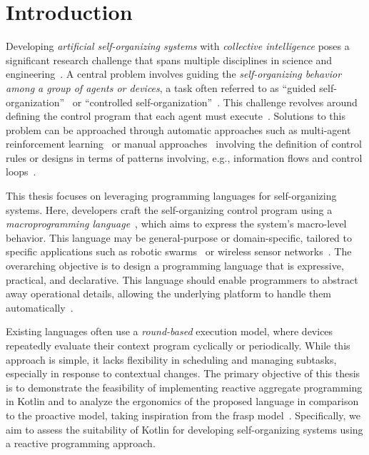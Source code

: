 
\chapter{Introduction}
\label{chap:introduction}

Developing \textit{artificial self-organizing systems} with \textit{collective intelligence} poses a significant research challenge that spans multiple disciplines in science and engineering~\cite{Parunak2015, Gershenson2007, Singh2013, DeNicola2020}. A central problem involves guiding the \textit{self-organizing behavior among a group of agents or devices}, a task often referred to as ``guided self-organization''~\cite{Prokopenko2007} or ``controlled self-organization''~\cite{Schmeck2010}. This challenge revolves around defining the control program that each agent must execute~\cite{Martius2011}. Solutions to this problem can be approached through automatic approaches such as multi-agent reinforcement learning~\cite{Zhang2021} or manual approaches~\cite{Martius2011} involving the definition of control rules or designs in terms of patterns
involving, e.g., information flows and control loops~\cite{DeWolf2007}.

This thesis focuses on leveraging programming languages for self-organizing systems. Here, developers craft the self-organizing control program using a \textit{macroprogramming language}~\cite{Casadei2023_2, Jnior2022}, which aims to express the system's macro-level behavior. This language may be general-purpose or domain-specific, tailored to specific applications such as robotic swarms~\cite{Brambilla2013} or wireless sensor networks~\cite{Mottola2011}. The overarching objective is to design a programming language that is expressive, practical, and declarative. This language should enable programmers to abstract away operational details, allowing the underlying platform to handle them automatically~\cite{Noor2019, Casadei2020_2}.

Existing languages often use a \textit{round-based} execution model, where devices repeatedly evaluate their context program cyclically or periodically. While this approach is simple, it lacks flexibility in scheduling and managing subtasks, especially in response to contextual changes. The primary objective of this thesis is to demonstrate the feasibility of implementing reactive aggregate programming in Kotlin and to analyze the ergonomics of the proposed language in comparison to the proactive model, taking inspiration from the \ac{frasp} model~\cite{Casadei2023}. Specifically, we aim to assess the suitability of Kotlin for developing self-organizing systems using a reactive programming approach.

